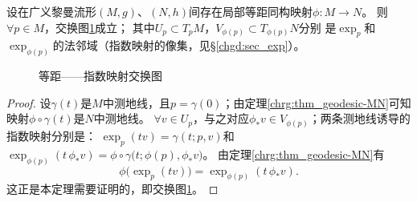 \begin{theorem}\label{chlg:thm_isoexp}
    设在广义黎曼流形$(M,g)$、$(N,h)$间存在局部等距同构映射$\phi:M\to N$。
    则$\forall p\in M$，交换图\ref{chlg:pic_exp-exchange}成立；
    其中$U_p\subset T_pM$，$V_{\phi(p)}\subset T_{\phi(p)}N$分别
    是$\exp_p$和$\exp_{\phi(p)}$的法邻域（指数映射的像集，见\S\ref{chgd:sec_exp}）。
\end{theorem}

\begin{figure}[htb]
    \centering
    \caption{等距——指数映射交换图}\label{chlg:pic_exp-exchange}
\end{figure}

\begin{proof}
    设$\gamma(t)$是$M$中测地线，且$p=\gamma(0)$；由定理\ref{chrg:thm_geodesic-MN}可知
    映射$\phi\circ\gamma(t)$是$N$中测地线。
    $\forall v\in U_p$，与之对应$\phi_* v \in V_{\phi(p)}$；两条测地线诱导的指数映射分别是：
    $\exp_p(t v)=\gamma(t;p,v)$和
    $\exp_{\phi(p)}(t\, \phi_*v)=\phi\circ\gamma\bigl(t;\phi(p),\phi_* v\bigr)$。
    由定理\ref{chrg:thm_geodesic-MN}有
    \begin{equation}\label{chlg:eqn_isoexp}
        \phi \bigl(\exp_p(t v)\bigr) = \exp_{\phi(p)}(t\, \phi_* v ) .
    \end{equation}
    这正是本定理需要证明的，即交换图\ref{chlg:pic_exp-exchange}。
\end{proof}

